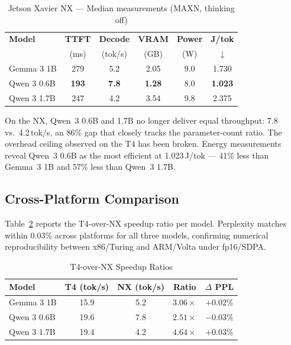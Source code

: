 \documentclass[conference]{IEEEtran}
\begin{document}
\begin{table}[t]
\caption{Jetson Xavier NX — Median measurements (MAXN, thinking off)}
\label{tab:nx}
\centering
\renewcommand{\arraystretch}{1.2}
\begin{tabular}{lccccc}
\toprule
\textbf{Model} & \textbf{TTFT} & \textbf{Decode} & \textbf{VRAM} & \textbf{Power} & \textbf{J/tok} \\
 & (ms) & (tok/s) & (GB) & (W) & $\downarrow$ \\
\midrule
Gemma 3 1B  & 279 & 5.2 & 2.05 & 9.0 & 1.730 \\
\rowcolor{lightgreen} Qwen 3 0.6B & \textbf{193} & \textbf{7.8} & \textbf{1.28} & 8.0 & \textbf{1.023} \\
Qwen 3 1.7B & 247 & 4.2 & 3.54 & 9.8 & 2.375 \\
\bottomrule
\end{tabular}
\end{table}

On the NX, Qwen~3 0.6B and 1.7B no longer deliver equal throughput: 7.8 vs.\ 4.2\,tok/s, an 86\% gap that closely tracks the parameter-count ratio. The overhead ceiling observed on the T4 has been broken. Energy measurements reveal Qwen~3 0.6B as the most efficient at 1.023\,J/tok --- 41\% less than Gemma~3 1B and 57\% less than Qwen~3 1.7B.

\subsection{Cross-Platform Comparison}
Table~\ref{tab:ratios} reports the T4-over-NX speedup ratio per model. Perplexity matches within 0.03\% across platforms for all three models, confirming numerical reproducibility between x86/Turing and ARM/Volta under fp16/SDPA.

\begin{table}[t]
\caption{T4-over-NX Speedup Ratios}
\label{tab:ratios}
\centering
\renewcommand{\arraystretch}{1.2}
\begin{tabular}{lcccc}
\toprule
\textbf{Model} & \textbf{T4 (tok/s)} & \textbf{NX (tok/s)} & \textbf{Ratio} & \textbf{$\Delta$ PPL} \\
\midrule
Gemma 3 1B  & 15.9 & 5.2 & $3.06\times$ & $+0.02\%$ \\
Qwen 3 0.6B & 19.6 & 7.8 & $2.51\times$ & $-0.03\%$ \\
Qwen 3 1.7B & 19.4 & 4.2 & $4.64\times$ & $+0.03\%$ \\
\bottomrule
\end{tabular}
\end{table}
\end{document}
